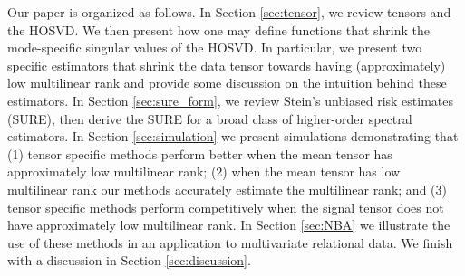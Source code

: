 Our paper is organized as follows. In Section \ref{sec:tensor}, we
review tensors and the HOSVD. We then present how one may define
functions that shrink the mode-specific singular values of the
HOSVD. In particular, we present two specific estimators that shrink
the data tensor towards having (approximately) low multilinear rank
and provide some discussion on the intuition behind these
estimators. In Section \ref{sec:sure_form}, we review Stein's unbiased
risk estimates (SURE), then derive the SURE for a broad class of
higher-order spectral estimators. In Section \ref{sec:simulation} we
present simulations demonstrating that (1) tensor specific methods
perform better when the mean tensor has approximately low multilinear
rank; (2) when the mean tensor has low multilinear rank our methods
accurately estimate the multilinear rank; and (3) tensor specific
methods perform competitively when the signal tensor does not have
approximately low multilinear rank. In Section \ref{sec:NBA} we
illustrate the use of these methods in an application to multivariate
relational data. We finish with a discussion in Section
\ref{sec:discussion}.
